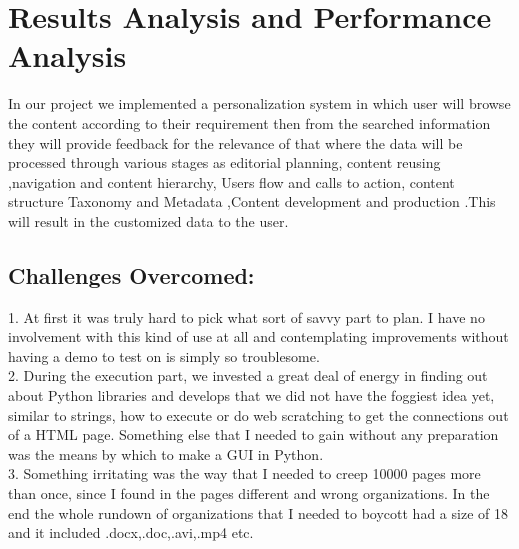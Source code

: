 \newpage
\chapter{Results Analysis and Performance Analysis}

In our project we implemented a personalization system in which user will browse the content according to their requirement then from the searched information they will provide feedback for the relevance of that where the data will be processed through various stages as editorial planning, content reusing ,navigation and content hierarchy, Users flow and calls to action, content structure Taxonomy and Metadata ,Content development and production .This will result in the customized data to the user.

\section{Challenges Overcomed:}

1. At first it was truly hard to pick what sort of savvy part to plan. I have no involvement
with this kind of use at all and contemplating improvements without having a demo to test
on is simply so troublesome.\\
2. During the execution part, we invested a great deal of energy in finding out about Python
libraries and develops that we did not have the foggiest idea yet, similar to strings, how to
execute or do web scratching to get the connections out of a HTML page. Something else
that I needed to gain without any preparation was the means by which to make a GUI in
Python.\\
3. Something irritating was the way that I needed to creep 10000 pages more than once,
since I found in the pages different and wrong organizations. In the end the whole rundown
of organizations that I needed to boycott had a size of 18 and it included .docx,.doc,.avi,.mp4 etc.



